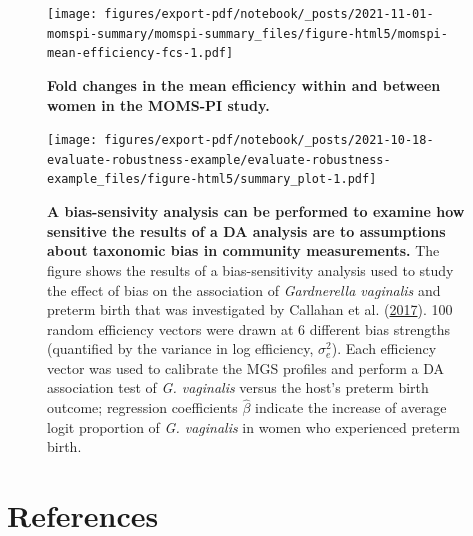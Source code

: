 \documentclass[
]{article}
\begin{document}
\begin{figure}
\centering
\texttt{[image: figures/export-pdf/notebook/\_posts/2021-11-01-momspi-summary/momspi-summary\_files/figure-html5/momspi-mean-efficiency-fcs-1.pdf]}
\caption{\label{fig:momspi-mean-efficiency-fcs}\textbf{Fold changes in the mean efficiency within and between women in the MOMS-PI study.}}
\end{figure}



\begin{figure}
\centering
\texttt{[image: figures/export-pdf/notebook/\_posts/2021-10-18-evaluate-robustness-example/evaluate-robustness-example\_files/figure-html5/summary\_plot-1.pdf]}
\caption{\label{fig:sensitivity-example}\textbf{A bias-sensivity analysis can be performed to examine how sensitive the results of a DA analysis are to assumptions about taxonomic bias in community measurements.} The figure shows the results of a bias-sensitivity analysis used to study the effect of bias on the association of \emph{Gardnerella vaginalis} and preterm birth that was investigated by Callahan et al. (\protect\hyperlink{ref-callahan2017repl}{2017}). 100 random efficiency vectors were drawn at 6 different bias strengths (quantified by the variance in log efficiency, \(\sigma_{e}^{2}\)). Each efficiency vector was used to calibrate the MGS profiles and perform a DA association test of \emph{G. vaginalis} versus the host's preterm birth outcome; regression coefficients \(\hat \beta\) indicate the increase of average logit proportion of \emph{G. vaginalis} in women who experienced preterm birth.}
\end{figure}



\hypertarget{references}{%
\section*{References}\label{references}}
\end{document}
